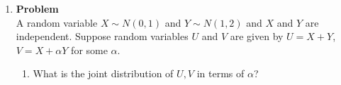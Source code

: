 \documentclass[12pt]{article}
\newenvironment{Ex}{\textbf{Problem}\vspace{.75em}\\}{}
\begin{document}
\begin{enumerate}
\begin{Ex}
\begin{solution}
\begin{enumerate}
\begin{equation}
          \label{eq:4a-pmf-z}
          p_N(n) = (1-z)^{n-1}(z)
        \end{equation}
        The expected value of a geometric distribution is known as
        \begin{equation}
          \label{eq:4a-expectation-z}
          \begin{aligned}
            E[qN] &= \frac{q}{z} \\
            \implies E[qN] &= \frac{q}{1-p} \\
          \end{aligned}
        \end{equation}
        The variance can be modeled by
        \begin{equation}
          \label{eq:4-variance}
          \begin{aligned}
            \text{Var}(qN) &= q^2\text{Var}(N) \\
            &= q^2\frac{1-z}{z^2} \\
            &= q^2\frac{1-(1-p)}{(1-p)^2} \\
            \implies \text{Var}(qN) &= \frac{q^2p}{(1-p)^2} \\
          \end{aligned}
        \end{equation}
      \item The expectation of the total money broght can be modeled
        by
        \begin{equation}
          \label{eq:4b-expectation}
          \begin{aligned}
            E[qN M] &= q E[N] E[M] \\
            \implies E[qN M] &= \frac{q}{(1-p)\lambda} \\
          \end{aligned}
        \end{equation}
        {\color{red} \huge TODO VARIANCE}
      \end{enumerate}
    \end{solution}
  \end{Ex}
\item
  \begin{Ex}
    A random variable $X \sim N(0,1)$ and $Y \sim N(1,2)$ and $X$ and
    $Y$ are independent. Suppose random variables $U$ and $V$ are
    given by $U=X+Y$, $V=X+\alpha Y$ for some $\alpha$.
    \begin{enumerate}
    \item What is the joint distribution of $U,V$ in terms of
      $\alpha$?

\end{enumerate}
\end{Ex}
\end{enumerate}
\end{document}
